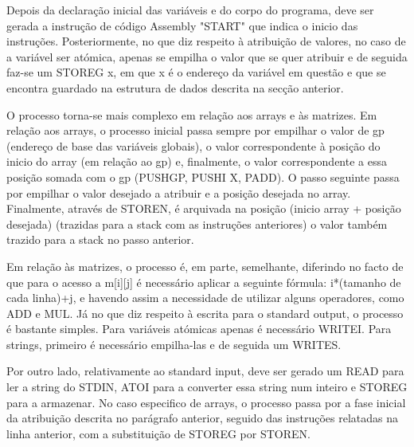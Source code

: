 \documentclass{report}
\begin{document}
Depois da declaração inicial das variáveis e do corpo do programa, deve ser gerada a instrução de código Assembly "START" que indica o inicio das instruções. 
Posteriormente, no que diz respeito à atribuição de valores, no caso de a variável ser atómica, apenas se empilha o valor que se quer atribuir e de seguida faz-se um STOREG x, em que x é o endereço da variável em questão e que se encontra guardado na estrutura de dados descrita na secção anterior.

O processo torna-se mais complexo em relação aos arrays e às matrizes. Em relação aos arrays, o processo inicial passa sempre por empilhar o valor de gp (endereço de base das variáveis globais), o valor correspondente à posição do inicio do array (em relação ao gp) e, finalmente, o valor correspondente a essa posição somada com o gp (PUSHGP, PUSHI X, PADD). O passo seguinte passa por empilhar o valor desejado a atribuir e a posição desejada no array. Finalmente, através de STOREN, é arquivada na posição (inicio array + posição desejada) (trazidas para a stack com as instruções anteriores) o valor também trazido para a stack no passo anterior.  
 
Em relação às matrizes, o processo é, em parte, semelhante, diferindo no facto de que para o acesso a m[i][j] é necessário aplicar a seguinte fórmula: i*(tamanho de cada linha)+j, e havendo assim a necessidade de utilizar alguns operadores, como ADD e MUL. 
Já no que diz respeito à escrita para o standard output, o processo é bastante simples. Para variáveis atómicas apenas é necessário WRITEI. Para strings, primeiro é necessário empilha-las e de seguida um WRITES. 

Por outro lado, relativamente ao standard input, deve ser gerado um READ para ler a string do STDIN, ATOI para a converter essa string num inteiro e STOREG para a armazenar. No caso especifico de arrays, o processo passa por a fase inicial da atribuição descrita no parágrafo anterior, seguido das instruções relatadas na linha anterior, com a substituição de STOREG por STOREN.
\end{document}
